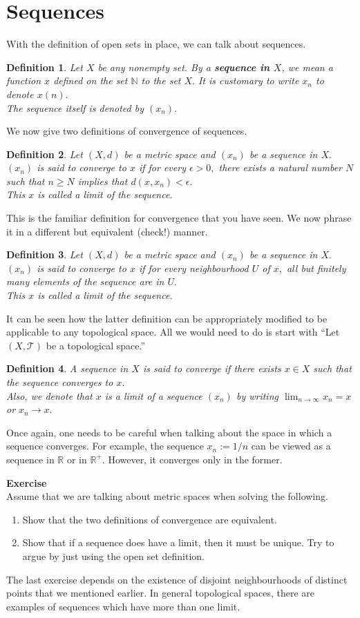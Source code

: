 \documentclass{article}
\newtheorem{defn}{Definition}
\newcounter{exercise}
\newcommand{\exercise}{\refstepcounter{exercise}\par\medskip
   {\textbf{Exercise \theexercise }} \rmfamily}
\begin{document}
	\section{Sequences}
	With the definition of open sets in place, we can talk about sequences.
	\begin{defn}
		Let $X$ be any nonempty set. By a \textbf{sequence in $X$}, we mean a function $x$ defined on the set $\mathbb{N}$ to the set $X.$ It is customary to write $x_n$ to denote $x(n).$\\
		The sequence itself is denoted by $(x_n).$
	\end{defn}
	We now give two definitions of convergence of sequences.
	\begin{defn}
		Let $(X, d)$ be a metric space and $(x_n)$ be a sequence in $X.$\\
		$(x_n)$ is said to converge to $x$ if for every $\epsilon > 0,$ there exists a natural number $N$ such that $n \ge N$ implies that $d(x, x_n) < \epsilon.$\\
		This $x$ is called a limit of the sequence.
	\end{defn}
	This is the familiar definition for convergence that you have seen. We now phrase it in a different but equivalent (check!) manner.
	\begin{defn}
		Let $(X, d)$ be a metric space and $(x_n)$ be a sequence in $X.$\\
		$(x_n)$ is said to converge to $x$ if for every neighbourhood $U$ of $x,$ all but finitely many elements of the sequence are in $U.$\\
		This $x$ is called a limit of the sequence.
	\end{defn}
	It can be seen how the latter definition can be appropriately modified to be applicable to any topological space. All we would need to do is start with ``Let $(X, \mathcal{T})$ be a topological space.''
	\begin{defn}
		A sequence in $X$ is said to converge if there exists $x \in X$ such that the sequence converges to $x.$\\
		Also, we denote that $x$ is a limit of a sequence $(x_n)$ by writing $\displaystyle\lim_{n\to \infty}x_n = x$ or $x_n \to x.$
	\end{defn}
	Once again, one needs to be careful when talking about the space in which a sequence converges. For example, the sequence $x_n := 1/n$ can be viewed as a sequence in $\mathbb{R}$ or in $\mathbb{R}^+.$ However, it converges only in the former.\\
	\exercise\\
	Assume that we are talking about metric spaces when solving the following.
	\begin{enumerate}[nosep]
		\item Show that the two definitions of convergence are equivalent.
		\item Show that if a sequence does have a limit, then it must be unique. Try to argue by just using the open set definition.
	\end{enumerate}
	The last exercise depends on the existence of disjoint neighbourhoods of distinct points that we mentioned earlier. In general topological spaces, there are examples of sequences which have more than one limit.
\end{document}
